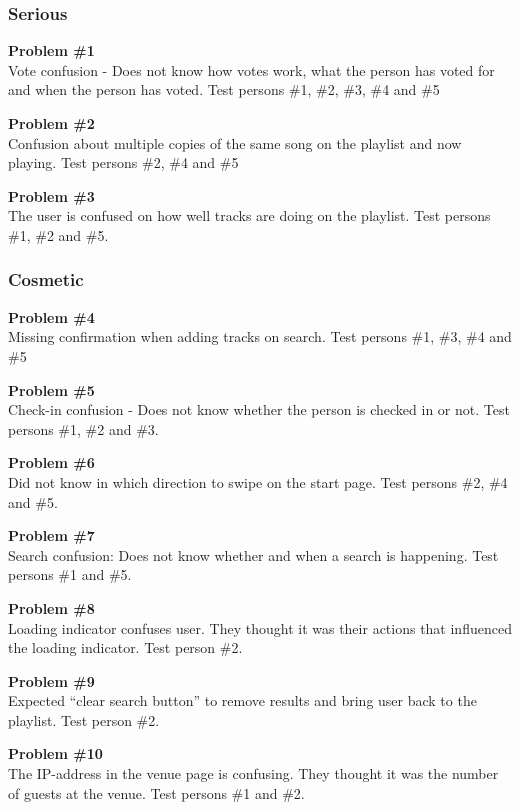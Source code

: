 \subsubsection{Serious}
\textbf{Problem \#1}\\
    Vote confusion - Does not know how votes work, what the person has
    voted for and when the person has voted. Test persons \#1, \#2,
    \#3, \#4 and \#5

\noindent\textbf{Problem \#2}\\
    Confusion about multiple copies of the same song on the playlist
    and now playing. Test persons \#2, \#4 and \#5

\noindent\textbf{Problem \#3}\\
    The user is confused on how well tracks are doing on the
    playlist. Test persons \#1, \#2 and \#5.

\subsubsection{Cosmetic}
\textbf{Problem \#4}\\
    Missing confirmation when adding tracks on search. Test persons
    \#1, \#3, \#4 and \#5

\noindent\textbf{Problem \#5}\\
    Check-in confusion - Does not know whether the person is checked
    in or not. Test persons \#1, \#2 and \#3.

\noindent\textbf{Problem \#6}\\
    Did not know in which direction to swipe on the start page. Test
    persons \#2, \#4 and \#5.

\noindent\textbf{Problem \#7}\\
    Search confusion: Does not know whether and when a search is
    happening. Test persons \#1 and \#5.

\noindent\textbf{Problem \#8}\\
    Loading indicator confuses user. They thought it was their actions
    that influenced the loading indicator. Test person \#2.

\noindent\textbf{Problem \#9}\\
    Expected “clear search button” to remove results and bring user
    back to the playlist. Test person \#2.

\noindent\textbf{Problem \#10}\\
    The IP-address in the venue page is confusing. They thought it was
    the number of guests at the venue. Test persons \#1 and \#2.

